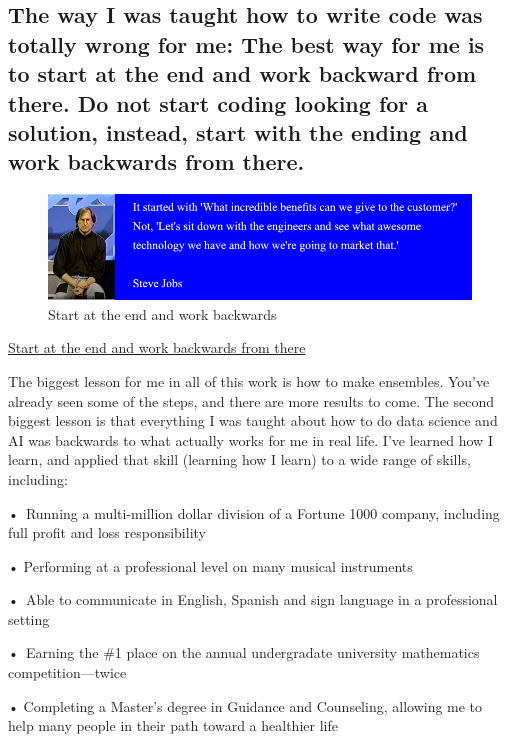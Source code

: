 \documentclass[
]{book}
\begin{document}
\subsection{The way I was taught how to write code was totally wrong for me: The best way for me is to start at the end and work backward from there. Do not start coding looking for a solution, instead, start with the ending and work backwards from there.}\label{the-way-i-was-taught-how-to-write-code-was-totally-wrong-for-me-the-best-way-for-me-is-to-start-at-the-end-and-work-backward-from-there.-do-not-start-coding-looking-for-a-solution-instead-start-with-the-ending-and-work-backwards-from-there.}

\begin{figure}
\centering
\includegraphics{_book/images/Steve Jobs.jpg}
\caption{Start at the end and work backwards}
\end{figure}

\href{https://www.youtube.com/watch?v=oeqPrUmVz-o}{Start at the end and work backwards from
there}

The biggest lesson for me in all of this work is how to make ensembles.
You've already seen some of the steps, and there are more results to
come. The second biggest lesson is that everything I was taught about
how to do data science and AI was backwards to what actually works for
me in real life. I've learned how I learn, and applied that skill
(learning how I learn) to a wide range of skills, including:

•~Running a multi-million dollar division of a Fortune 1000 company,
including full profit and loss responsibility

• Performing at a professional level on many musical instruments

•~Able to communicate in English, Spanish and sign language in a
professional setting

•~Earning the \#1 place on the annual undergradate university mathematics
competition---twice

• Completing a Master's degree in Guidance and Counseling, allowing me
to help many people in their path toward a healthier life
\end{document}
